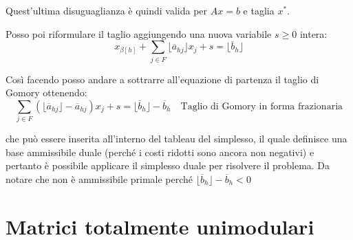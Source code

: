 \begin{itemize}
	Quest'ultima disuguaglianza è quindi valida per $Ax = b$ e taglia $x^*$.
	
	Posso poi riformulare il taglio aggiungendo una nuova variabile $s\geq 0$ intera:
	$$
	 x_{\beta[h]} + \sum_{j \in F} \lfloor \overline{a}_{hj} \rfloor x_j + s =  \lfloor \overline{b}_h\rfloor
	$$
	
	Così facendo posso andare a sottrarre all'equazione di partenza il taglio di Gomory ottenendo:
	$$
	\sum_{j\in F}(\lfloor \overline{a}_{hj} \rfloor-  \overline{a}_{hj})x_j + s = \lfloor \overline{b}_h\rfloor -\overline{b}_h \quad \text{Taglio di Gomory in forma frazionaria}
	$$
	
	che può essere inserita all'interno del tableau del simplesso, il quale definisce una base ammissibile duale (perché i costi ridotti sono ancora non negativi) e pertanto è possibile applicare il simplesso duale per risolvere il problema. Da notare che non è ammissibile primale perché $\lfloor \overline{b}_h\rfloor -\overline{b}_h < 0$ 
\end{itemize}


\section{Matrici totalmente unimodulari}


